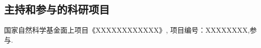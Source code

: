 \fi

\ifblindreview
\else
\subsection*{主持和参与的科研项目}
\begin{enumerate}[label={[\arabic*]}]
\item 国家自然科学基金面上项目《XXXXXXXXXXXX》, 项目编号：XXXXXXXX,参与.
\end{enumerate}

\fi

\newpage

\ifblindreview
\else

\newpage
\fi